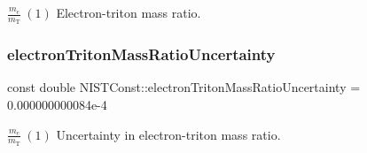 $\frac{m_e}{m_\textrm{T}} \ (1)$ Electron-\/triton mass ratio. \mbox{\label{group___electron_ga424cccf2b6f72fd447313bac0994029e}} 
\subsubsection{\texorpdfstring{electron\+Triton\+Mass\+Ratio\+Uncertainty}{electronTritonMassRatioUncertainty}}
{\footnotesize\ttfamily const double N\+I\+S\+T\+Const\+::electron\+Triton\+Mass\+Ratio\+Uncertainty = 0.\+000000000084e-\/4}

$\frac{m_e}{m_\textrm{T}} \ (1)$ Uncertainty in electron-\/triton mass ratio. 